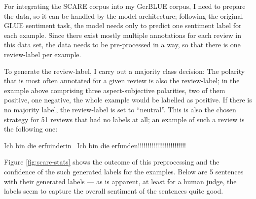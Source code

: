 




For integrating the SCARE corpus into my GerBLUE corpus, I need to prepare the data, so it
can be handled by the model architecture; following the original GLUE sentiment task, the
model needs only to predict one sentiment label for each example. Since there exist mostly
multiple annotations for each review in this data set, the data needs to be pre-processed
in a way, so that there is one review-label per example.

To generate the review-label, I carry out a majority class decision:
The polarity that is most often annotated for a given review is also the review-label; in the
example above comprising three aspect-subjective polarities, two of them positive, one negative,
the whole example would be labelled as positive.
If there is no majority label, the review-label is set to ``neutral''.
This is also the chosen strategy for 51 reviews that had no labels at all; an example of such a
review is the following one:

\begin{examples}
  \item Ich bin die erfuinderin \textbar \textbar\ Ich bin die erfunden!!!!!!!!!!!!!!!!!!!!!!!!!
\end{examples}

Figure \ref{fig:scare-stats} shows the outcome of this preprocessing and
the confidence of the such generated labels for the examples. Below are 5 sentences with their
generated labels --- as is apparent, at least for a human judge, the labels seem to capture the
overall sentiment of the sentences quite good.


